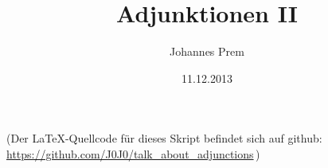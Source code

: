 
\subject{Seminar: Kategorien}
\title{Adjunktionen II}
\author{Johannes Prem}
\date{11.12.2013}

\maketitle
\thispagestyle{empty}

\vfill
\begin{center}\footnotesize%
    (Der \LaTeX-Quellcode für dieses Skript befindet sich auf github:
    \url{https://github.com/J0J0/talk_about_adjunctions}\,)
\end{center}
\newpage
